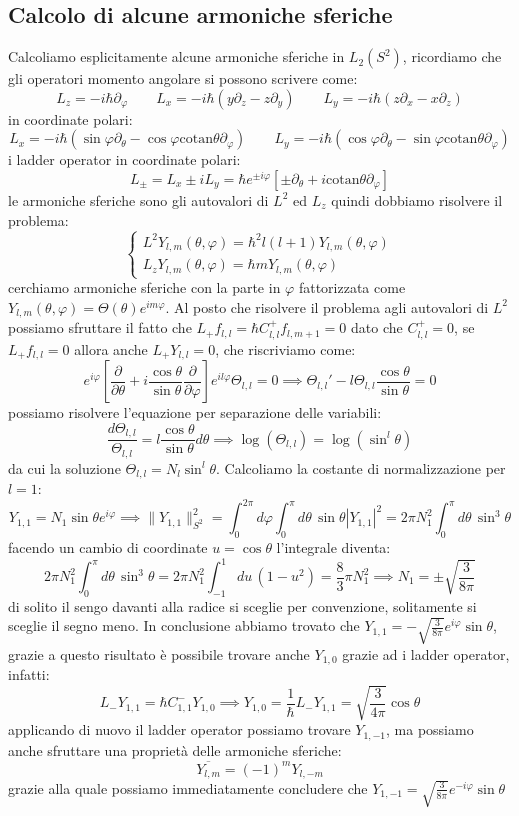 \subsection{Calcolo di alcune armoniche sferiche}
Calcoliamo esplicitamente alcune armoniche sferiche in $L_2(S^2)$, ricordiamo che gli operatori momento angolare si possono scrivere come:
\[L_z = -i\hbar \partial_\varphi \qquad L_x = -i\hbar(y\partial_z - z\partial_y) \qquad L_y = -i\hbar(z\partial_x - x\partial_z)\]
in coordinate polari:
\[L_x = -i\hbar (\sin\varphi \partial_\theta - \cos\varphi\text{cotan}\theta\partial_\varphi)\qquad L_y = -i\hbar(\cos\varphi\partial_\theta -\sin\varphi\text{cotan}\theta\partial_\varphi )\]
i ladder operator in coordinate polari:
\[L_\pm = L_x\pm iL_y = \hbar e^{\pm i\varphi}[\pm \partial_\theta + i \text{cotan}\theta\partial_\varphi]\]
le armoniche sferiche sono gli autovalori di $L^2$ ed $L_z$ quindi dobbiamo risolvere il problema:
\[\begin{cases}
L^2Y_{l,m}(\theta,\varphi) = \hbar^2l(l+1)Y_{l,m}(\theta,\varphi)\\
L_zY_{l,m}(\theta,\varphi) = \hbar m Y_{l,m}(\theta,\varphi)
\end{cases}\]
cerchiamo armoniche sferiche con la parte in $\varphi$ fattorizzata come $ Y_{l,m}(\theta,\varphi) = \Theta(\theta)e^{im\varphi}$. Al posto che risolvere il problema agli autovalori di $L^2$ possiamo sfruttare il fatto che $L_+f_{l,l} = \hbar C^+_{l,l}f_{l,m+1} = 0$ dato che $C^+_{l,l}=0$, se  $L_+f_{l,l}=0$ allora anche $L_+Y_{l,l}=0$, che riscriviamo come:
\[e^{i\varphi}\left[\frac{\partial}{\partial\theta} + i \frac{\cos\theta}{\sin\theta}\frac{\partial}{\partial \varphi}\right]e^{il\varphi}\Theta_{l,l} = 0 \implies \Theta_{l,l}' -l \Theta_{l,l} \frac{\cos\theta}{\sin\theta} = 0\]
possiamo risolvere l'equazione per separazione delle variabili:
\[\frac{d\Theta_{l,l}}{\Theta_{l,l}} = l\frac{\cos\theta}{\sin\theta}d\theta \implies \log(\Theta_{l,l}) = \log(\sin^l\theta) \]
da cui la soluzione $\Theta_{l,l} = N_l \sin^l\theta$. Calcoliamo la costante di normalizzazione per $l=1$:
\[Y_{1,1} = N_1 \sin\theta e^{i\varphi} \implies \|Y_{1,1}\|^2_{S^2}=\int_0^{2\pi}d\varphi\int_0^{\pi}d\theta\, \sin\theta |Y_{1,1}|^2 = 2\pi N_1^2\int_0^{\pi}d\theta\, \sin^3\theta \]
facendo un cambio di coordinate $u=\cos\theta$ l'integrale diventa:
\[2\pi N_1^2\int_0^{\pi}d\theta\, \sin^3\theta  = 2\pi N_1^2\int_{-1}^{1}du\,(1-u^2) = \frac{8}{3}\pi N_1^2 \implies N_1 = \pm\sqrt{\frac{3}{8\pi}} \]
di solito il sengo davanti alla radice si sceglie per convenzione, solitamente si sceglie il segno meno. In conclusione abbiamo trovato che $Y_{1,1} = -\sqrt{\frac{3}{8\pi}} e^{i\varphi}\sin\theta$, grazie a questo risultato è possibile trovare anche $Y_{1,0}$ grazie ad i ladder operator, infatti:
\[L_- Y_{1,1} = \hbar C^{-}_{1,1} Y_{1,0} \implies Y_{1,0} = \frac{1}{\hbar}L_-Y_{1,1}  = \sqrt{\frac{3}{4\pi}}\cos\theta\]
applicando di nuovo il ladder operator possiamo trovare $Y_{1,-1}$, ma possiamo anche sfruttare una proprietà delle armoniche sferiche:
\[\overline{Y_{l,m}} = (-1)^m Y_{l,-m}\]
grazie alla quale possiamo immediatamente concludere che $Y_{1,-1} = \sqrt{\frac{3}{8\pi}} e^{-i\varphi}\sin\theta$
